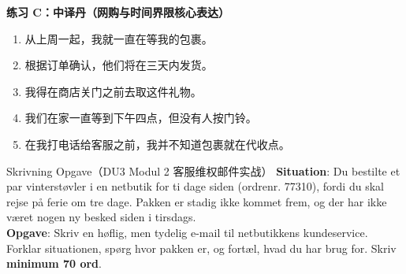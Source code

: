 \textbf{练习 C：中译丹（网购与时间界限核心表达）}
\begin{enumerate}
  \item 从上周一起，我就一直在等我的包裹。
  \item 根据订单确认，他们将在三天内发货。
  \item 我得在商店关门之前去取这件礼物。
  \item 我们在家一直等到下午四点，但没有人按门铃。
  \item 在我打电话给客服之前，我并不知道包裹就在代收点。
\end{enumerate}


\begin{emailbox}{Skrivning Opgave（DU3 Modul 2 客服维权邮件实战）}
\textbf{Situation}: Du bestilte et par vinterstøvler i en netbutik for ti dage siden (ordrenr. 77310), fordi du skal rejse på ferie om tre dage. Pakken er stadig ikke kommet frem, og der har ikke været nogen ny besked siden i tirsdags.\\
\textbf{Opgave}: Skriv en høflig, men tydelig e-mail til netbutikkens kundeservice. Forklar situationen, spørg hvor pakken er, og fortæl, hvad du har brug for. Skriv \textbf{minimum 70 ord}.
\end{emailbox}

